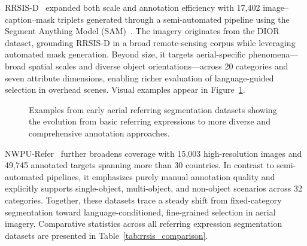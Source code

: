 RRSIS-D~\cite{liu2024rotated} expanded both scale and annotation efficiency with 17,402 image–caption–mask triplets generated through a semi-automated pipeline using the Segment Anything Model (SAM)~\cite{sam}. The imagery originates from the DIOR dataset, grounding RRSIS-D in a broad remote-sensing corpus while leveraging automated mask generation. Beyond size, it targets aerial-specific phenomena—broad spatial scales and diverse object orientations—across 20 categories and seven attribute dimensions, enabling richer evaluation of language-guided selection in overhead scenes. Visual examples appear in Figure~\ref{fig:aerial_datasets}.

\begin{figure}[t]
\centering
{}
\hfill
{}
\caption{Examples from early aerial referring segmentation datasets showing the evolution from basic referring expressions to more diverse and comprehensive annotation approaches.}
\label{fig:aerial_datasets}
\end{figure}

NWPU-Refer~\cite{yang2024large} further broadens coverage with 15,003 high-resolution images and 49,745 annotated targets spanning more than 30 countries. In contrast to semi-automated pipelines, it emphasizes purely manual annotation quality and explicitly supports single-object, multi-object, and non-object scenarios across 32 categories. Together, these datasets trace a steady shift from fixed-category segmentation toward language-conditioned, fine-grained selection in aerial imagery. Comparative statistics across all referring expression segmentation datasets are presented in Table~\ref{tab:rrsis_comparison}.

